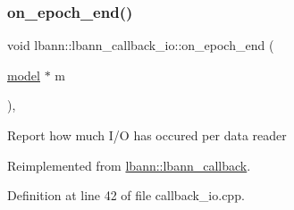 \subsubsection{\texorpdfstring{on\+\_\+epoch\+\_\+end()}{on\_epoch\_end()}}
{\footnotesize\ttfamily void lbann\+::lbann\+\_\+callback\+\_\+io\+::on\+\_\+epoch\+\_\+end (\begin{DoxyParamCaption}\item[{\hyperlink{classlbann_1_1model}{model} $\ast$}]{m }\end{DoxyParamCaption})\hspace{0.3cm}{\ttfamily [override]}, {\ttfamily [virtual]}}

Report how much I/O has occured per data reader 

Reimplemented from \hyperlink{classlbann_1_1lbann__callback_a1fc71110e7f754bf73c9e0f344a448a5}{lbann\+::lbann\+\_\+callback}.



Definition at line 42 of file callback\+\_\+io.\+cpp.


